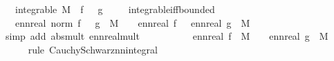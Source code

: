 \begin{isabellebody}
\ \ \ {\isachardoublequoteopen}integrable\ M\ {\isacharparenleft}{\kern0pt}{\isasymlambda}{\isasymomega}{\isachardot}{\kern0pt}\ f\ {\isasymomega}\ {\isacharasterisk}{\kern0pt}\ g\ {\isasymomega}{\isacharparenright}{\kern0pt}{\isachardoublequoteclose}\isanewline
%
\isadelimproof
\ \ %
\endisadelimproof
%
\isatagproof
{}\isamarkupfalse%
\ integrable{\isacharunderscore}{\kern0pt}iff{\isacharunderscore}{\kern0pt}bounded\isanewline
{}\isamarkupfalse%
\isanewline
\ \ \isamarkupfalse%
\ {\isachardoublequoteopen}{\isacharparenleft}{\kern0pt}{\isasymintegral}\isactrlsup {\isacharplus}{\kern0pt}\ {\isasymomega}{\isachardot}{\kern0pt}\ ennreal\ {\isacharparenleft}{\kern0pt}norm\ {\isacharparenleft}{\kern0pt}f\ {\isasymomega}\ {\isacharasterisk}{\kern0pt}\ g\ {\isasymomega}{\isacharparenright}{\kern0pt}{\isacharparenright}{\kern0pt}\ {\isasympartial}M{\isacharparenright}{\kern0pt}\ {\isacharequal}{\kern0pt}\ {\isacharparenleft}{\kern0pt}{\isasymintegral}\isactrlsup {\isacharplus}{\kern0pt}\ {\isasymomega}{\isachardot}{\kern0pt}\ ennreal\ {\isasymbar}f\ {\isasymomega}{\isasymbar}\ {\isacharasterisk}{\kern0pt}\ ennreal\ {\isasymbar}g\ {\isasymomega}{\isasymbar}\ {\isasympartial}M{\isacharparenright}{\kern0pt}\ \isanewline
\ \ \ \ \isamarkupfalse%
\ {\isacharparenleft}{\kern0pt}simp\ add{\isacharcolon}{\kern0pt}\ abs{\isacharunderscore}{\kern0pt}mult\ ennreal{\isacharunderscore}{\kern0pt}mult{\isacharparenright}{\kern0pt}\isanewline
\ \ \isamarkupfalse%
\ \isamarkupfalse%
\ {\isachardoublequoteopen}{\isachardot}{\kern0pt}{\isachardot}{\kern0pt}{\isachardot}{\kern0pt}\ {\isasymle}\ \ {\isacharparenleft}{\kern0pt}{\isasymintegral}\isactrlsup {\isacharplus}{\kern0pt}\ {\isasymomega}{\isachardot}{\kern0pt}\ ennreal\ {\isasymbar}f\ {\isasymomega}{\isasymbar}{\isacharcircum}{\kern0pt}{}\ {\isasympartial}M{\isacharparenright}{\kern0pt}\ {\isacharasterisk}{\kern0pt}\ {\isacharparenleft}{\kern0pt}{\isasymintegral}\isactrlsup {\isacharplus}{\kern0pt}\ {\isasymomega}{\isachardot}{\kern0pt}\ ennreal\ {\isasymbar}g\ {\isasymomega}{\isasymbar}{\isacharcircum}{\kern0pt}{}\ {\isasympartial}M{\isacharparenright}{\kern0pt}{\isachardoublequoteclose}\isanewline
\ \ \ \ \isamarkupfalse%
\ {\isacharparenleft}{\kern0pt}rule\ Cauchy{\isacharunderscore}{\kern0pt}Schwarz{\isacharunderscore}{\kern0pt}nn{\isacharunderscore}{\kern0pt}integral{\isacharparenright}{\kern0pt}\ \isamarkupfalse%

\end{isabellebody}
